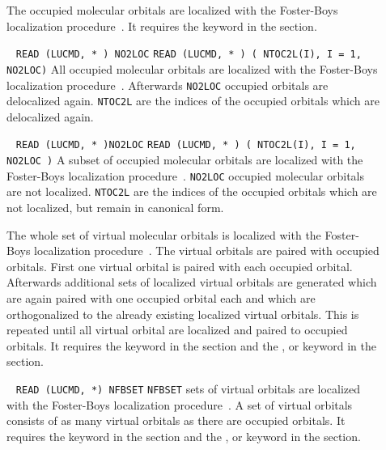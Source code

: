 \begin{description}
\item [] The occupied molecular orbitals are localized with
the Foster-Boys localization procedure~\cite{Boyloc}. It requires the
 keyword in the  section.

\item []\verb| |\newline
 \verb|READ (LUCMD, * ) NO2LOC|\newline
 \verb|READ (LUCMD, * ) ( NTOC2L(I), I = 1, NO2LOC)|\newline
All occupied molecular orbitals are localized with the Foster-Boys
localization procedure~\cite{Boyloc}. Afterwards \verb|NO2LOC| occupied
orbitals are delocalized again. \verb|NTOC2L|  are the indices of the
occupied orbitals which are delocalized again.

\item []\verb| |\newline
 \verb|READ (LUCMD, * )NO2LOC|\newline
 \verb|READ (LUCMD, * ) ( NTOC2L(I), I = 1, NO2LOC )|\newline
A subset of occupied molecular orbitals are localized with the
Foster-Boys localization procedure~\cite{Boyloc}. \verb|NO2LOC|
occupied molecular orbitals are not localized. \verb|NTOC2L|  are the
indices of the occupied orbitals which are not localized, but remain in
canonical form.

\item [] The whole set of virtual molecular orbitals is localized with
the Foster-Boys localization procedure~\cite{Boyloc}. The virtual
orbitals are paired with occupied orbitals. First one virtual orbital
is paired with each occupied orbital. Afterwards additional sets of
localized virtual orbitals are generated which are again paired with
one occupied orbital each and which are orthogonalized to the already
existing localized virtual orbitals. This is repeated until all virtual
orbital are localized and paired to occupied orbitals. It requires the
 keyword in the  section and the ,
 or  keyword in the  section.


\item []\verb| |\newline
 \verb|READ (LUCMD, *) NFBSET|\newline
\verb|NFBSET| sets of virtual orbitals are localized with the
Foster-Boys localization procedure~\cite{Boyloc}. A set of virtual
orbitals consists of as many virtual orbitals as there are occupied
orbitals. It requires the  keyword in the 
section and the ,  or  keyword in
the  section.


\end{description}
